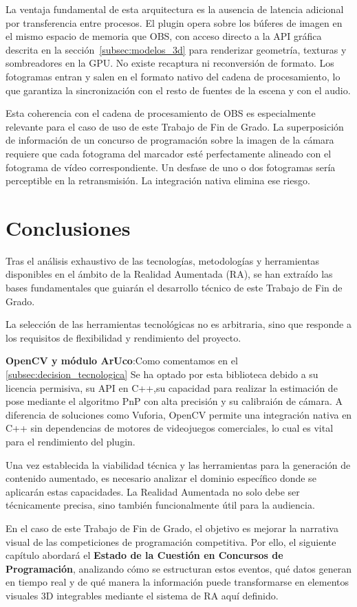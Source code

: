 La ventaja fundamental de esta arquitectura es la ausencia de latencia adicional por transferencia entre procesos. El plugin opera sobre los búferes de imagen en el mismo espacio de memoria que OBS, con acceso directo a la API gráfica descrita en la sección~\ref{subsec:modelos_3d} para renderizar geometría, texturas y sombreadores en la GPU. No existe recaptura ni reconversión de formato. Los fotogramas entran y salen en el formato nativo del cadena de procesamiento, lo que garantiza la sincronización con el resto de fuentes de la escena y con el audio.

Esta coherencia con el cadena de procesamiento de OBS es especialmente relevante para el caso de uso de este Trabajo de Fin de Grado. La superposición de información de un concurso de programación sobre la imagen de la cámara requiere que cada fotograma del marcador esté perfectamente alineado con el fotograma de vídeo correspondiente. Un desfase de uno o dos fotogramas sería perceptible en la retransmisión. La integración nativa elimina ese riesgo.

\section{Conclusiones}
\label{sec:conclusiones_ra}

Tras el análisis exhaustivo de las tecnologías, metodologías y herramientas disponibles en el ámbito de la Realidad Aumentada (RA), se han extraído las bases fundamentales que guiarán el desarrollo técnico de este Trabajo de Fin de Grado. 

La selección de las herramientas tecnológicas no es arbitraria, sino que responde a los requisitos de flexibilidad y rendimiento  del proyecto.

 \textbf{OpenCV y módulo ArUco}:Como comentamos en el \ref{subsec:decision_tecnologica} Se ha optado por esta biblioteca debido a su licencia permisiva, su API  en C++,su capacidad para realizar la estimación de pose mediante el algoritmo PnP con alta precisión y su calibraión de cámara. A diferencia de soluciones como Vuforia, OpenCV permite una integración nativa en C++ sin dependencias de motores de videojuegos comerciales, lo cual es vital para el rendimiento del plugin.

Una vez establecida la viabilidad técnica y las herramientas para la generación de contenido aumentado, es necesario analizar el dominio específico donde se aplicarán estas capacidades. La Realidad Aumentada no solo debe ser técnicamente precisa, sino también funcionalmente útil para la audiencia. 

En el caso de este Trabajo de Fin de Grado, el objetivo es mejorar la narrativa visual de las competiciones de programación competitiva. Por ello, el siguiente capítulo abordará el \textbf{Estado de la Cuestión en Concursos de Programación}, analizando cómo se estructuran estos eventos, qué datos generan en tiempo real y de qué manera la información puede transformarse en elementos visuales 3D integrables mediante el sistema de RA aquí definido.